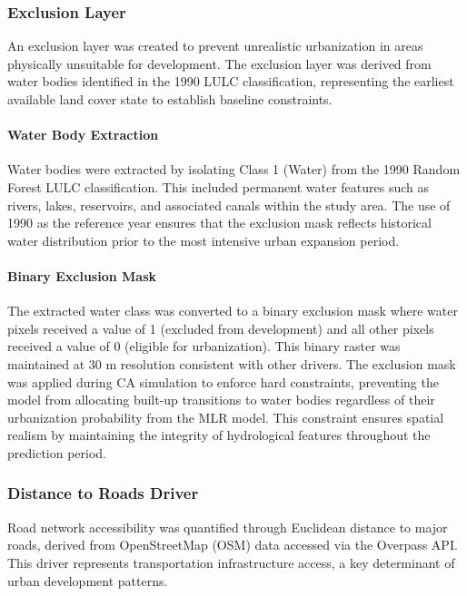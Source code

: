 \documentclass[12pt,a4paper]{article}
\begin{document}
\subsubsection{Exclusion Layer}

An exclusion layer was created to prevent unrealistic urbanization in areas physically unsuitable for development. The exclusion layer was derived from water bodies identified in the 1990 LULC classification, representing the earliest available land cover state to establish baseline constraints.

\paragraph{Water Body Extraction}
Water bodies were extracted by isolating Class 1 (Water) from the 1990 Random Forest LULC classification. This included permanent water features such as rivers, lakes, reservoirs, and associated canals within the study area. The use of 1990 as the reference year ensures that the exclusion mask reflects historical water distribution prior to the most intensive urban expansion period.

\paragraph{Binary Exclusion Mask}
The extracted water class was converted to a binary exclusion mask where water pixels received a value of 1 (excluded from development) and all other pixels received a value of 0 (eligible for urbanization). This binary raster was maintained at 30 m resolution consistent with other drivers. The exclusion mask was applied during CA simulation to enforce hard constraints, preventing the model from allocating built-up transitions to water bodies regardless of their urbanization probability from the MLR model. This constraint ensures spatial realism by maintaining the integrity of hydrological features throughout the prediction period.

\subsubsection{Distance to Roads Driver}

Road network accessibility was quantified through Euclidean distance to major roads, derived from OpenStreetMap (OSM) \cite{haklay2008} data accessed via the Overpass API. This driver represents transportation infrastructure access, a key determinant of urban development patterns.
\end{document}
